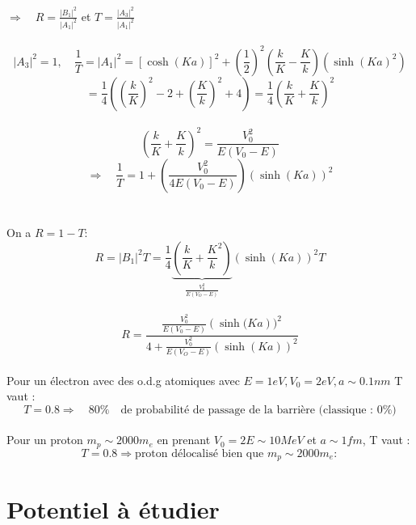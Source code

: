 \documentclass[11pt]{report}
\begin{document}
$\Rightarrow \quad R=\frac{|B_1|^2}{|A_1|^2}$ et $T=\frac{|A_3|^2}{|A_1|^2}$\\\\
\begin{equation}
    |A_3|^2=1,\quad \frac{1}{T}=|A_1|^2=[\cosh(Ka)]^2+\left( \frac{1}{2}\right)^2\left( \frac{k}{K}-\frac{K}{k} \right)(\sinh(Ka)^2)
    \nonumber
\end{equation}
\begin{equation}
    =\frac{1}{4}\left( \left(\frac{k}{K}\right)^2-2+\left(\frac{K}{k}\right)^2+4\right)=\frac{1}{4}\left(\frac{k}{K}+\frac{K}{k}\right)^2
    \nonumber
\end{equation}\\
\begin{equation}
    \left(\frac{k}{K}+\frac{K}{k}\right)^2=\frac{V_0^2}{E(V_0-E)}
    \nonumber
\end{equation}
\begin{equation}
    \Rightarrow \quad \frac{1}{T}=1+\left( \frac{V_0^2}{4E(V_0-E)} \right)\left(\sinh(Ka)\right)^2
    \nonumber
\end{equation}\\\\
On a $R=1-T :$
\begin{equation}
    R=|B_1|^2T=\frac{1}{4}\underbrace{\left( \frac{k}{K}+\frac{K}{k}^2 \right)}_{\frac{V_0^2}{E(V_O-E)}}
    (\sinh(Ka))^2T
    \nonumber
\end{equation}\\
\begin{equation}
    R=\frac{\frac{V_0^2}{E(V_0-E)}\left( \sinh(Ka\right))^2}{4+\frac{V_0^2}{E(V_O-E)}(\sinh(Ka))^2}
    \nonumber
\end{equation}\\
Pour un électron avec des o.d.g atomiques avec $E=1eV, V_0=2eV, a\sim 0.1nm$ T vaut :
\begin{equation}
    T=0.8 \Rightarrow \quad 80\% \quad\textrm{de probabilité de passage de la barrière (classique : 0\%)}
    \nonumber
\end{equation}\\
Pour un proton $m_p\sim2000m_e$ en prenant $V_0=2E\sim10MeV$ et $a\sim1fm$, T vaut :\\
\begin{equation}
    T=0.8 \Rightarrow \textrm{proton délocalisé bien que }m_p\sim 2000m_e:
    \nonumber
\end{equation}


\newpage
\section{Potentiel à étudier}
\end{document}
